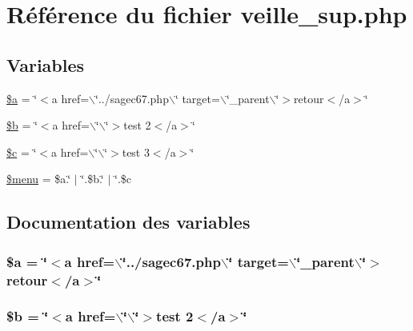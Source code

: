 \hypertarget{veille__sup_8php}{
\section{R\'{e}f\'{e}rence du fichier veille\_\-sup.php}
\label{veille__sup_8php}
}
\subsection*{Variables}
\begin{CompactItemize}
\item 
\hyperlink{veille__sup_8php_a0}{\$a} = \char`\"{}$<$a href=$\backslash$\char`\"{}../sagec67.php$\backslash$\char`\"{} target=$\backslash$\char`\"{}\_\-parent$\backslash$\char`\"{}$>$retour$<$/a$>$\char`\"{}
\item 
\hyperlink{veille__sup_8php_a1}{\$b} = \char`\"{}$<$a href=$\backslash$\char`\"{}$\backslash$\char`\"{}$>$test 2$<$/a$>$\char`\"{}
\item 
\hyperlink{veille__sup_8php_a2}{\$c} = \char`\"{}$<$a href=$\backslash$\char`\"{}$\backslash$\char`\"{}$>$test 3$<$/a$>$\char`\"{}
\item 
\hyperlink{veille__sup_8php_a3}{\$menu} = \$a.\char`\"{} $|$ \char`\"{}.\$b.\char`\"{} $|$ \char`\"{}.\$c
\end{CompactItemize}


\subsection{Documentation des variables}
\hypertarget{veille__sup_8php_a0}{
\subsubsection[\$a]{\setlength{\rightskip}{0pt plus 5cm}\$a = \char`\"{}$<$a href=$\backslash$\char`\"{}../sagec67.php$\backslash$\char`\"{} target=$\backslash$\char`\"{}\_\-parent$\backslash$\char`\"{}$>$retour$<$/a$>$\char`\"{}}}
\label{veille__sup_8php_a0}


\hypertarget{veille__sup_8php_a1}{
\subsubsection[\$b]{\setlength{\rightskip}{0pt plus 5cm}\$b = \char`\"{}$<$a href=$\backslash$\char`\"{}$\backslash$\char`\"{}$>$test 2$<$/a$>$\char`\"{}}}
\label{veille__sup_8php_a1}


